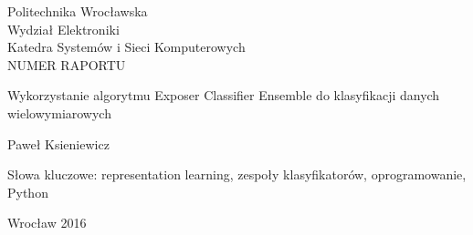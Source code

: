 \begin{titlepage}

\begin{center}
	\large Politechnika Wrocławska\\
	Wydział Elektroniki\\
	Katedra Systemów i Sieci Komputerowych\\
	NUMER RAPORTU	
\end{center}

\vspace*{7cm}
\hspace*{6cm}\parbox[p]{10cm}
{\large Wykorzystanie algorytmu Exposer Classifier Ensemble do klasyfikacji danych wielowymiarowych}
\vspace*{1cm}

\hspace*{6cm}\large Paweł Ksieniewicz

\vspace*{4cm}

\hspace*{6cm}\parbox{10cm}{\large Słowa kluczowe: representation learning, zespoły klasyfikatorów, oprogramowanie, Python}

\vspace*{5cm}

\begin{center}
	Wrocław 2016
\end{center}
\end{titlepage}
